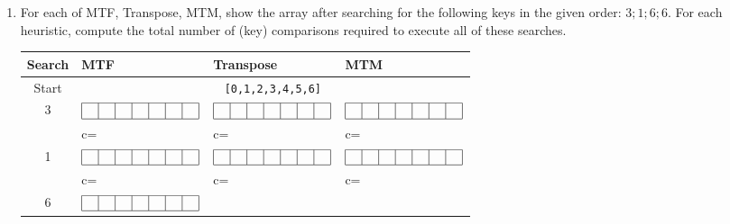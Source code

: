 \begin{enumerate}

\item For each of MTF, Transpose, MTM, show the array after searching for
the following keys in the given order: $3; 1; 6; 6.$ 
%
For each heuristic, compute the total number of (key) comparisons
required to execute all of these searches.

\begin{spaceForAnswer}
\begin{tabular}{|c|p{3.2cm}|p{3.2cm}|p{3.2cm}|}
\hline
Search & MTF & Transpose & MTM\\
\hline
\hline
Start&
\multicolumn{3}{|c|}{\tt [0,1,2,3,4,5,6]}\\
\hline
\hline
3
&$\begin{array}{|c|c|c|c|c|c|c|}\hline\ &\ &\ &\ &\ &\ &\ \\ \hline\end{array}$
&$\begin{array}{|c|c|c|c|c|c|c|}\hline\ &\ &\ &\ &\ &\ &\ \\ \hline\end{array}$
&$\begin{array}{|c|c|c|c|c|c|c|}\hline\ &\ &\ &\ &\ &\ &\ \\ \hline\end{array}$
\\
&
c= \hspace{.5cm} &
c= \hspace{.5cm} &
c= \hspace{.5cm} \\
\hline
1
&$\begin{array}{|c|c|c|c|c|c|c|}\hline\ &\ &\ &\ &\ &\ &\ \\ \hline\end{array}$
&$\begin{array}{|c|c|c|c|c|c|c|}\hline\ &\ &\ &\ &\ &\ &\ \\ \hline\end{array}$
&$\begin{array}{|c|c|c|c|c|c|c|}\hline\ &\ &\ &\ &\ &\ &\ \\ \hline\end{array}$
\\
&
c= \hspace{.5cm} &
c= \hspace{.5cm} &
c= \hspace{.5cm} \\
\hline
6
&$\begin{array}{|c|c|c|c|c|c|c|}\hline\ &\ &\ &\ &\ &\ &\ \\ \hline\end{array}$

\end{tabular}
\end{spaceForAnswer}
\end{enumerate}
